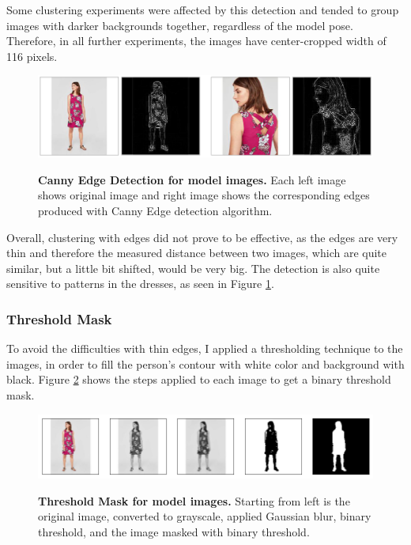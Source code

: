 \documentclass[12pt]{report}
\begin{document}
Some clustering experiments were affected by this detection and tended to group images with darker backgrounds together, regardless of the model pose. Therefore, in all further experiments, the images have center-cropped width of 116 pixels.

\begin{figure}[h]
\centering
{\includegraphics[width=\linewidth]{04_experiments/clustering/edges_data}}
\caption{\label{fig:cluster_edges_data} \textbf{Canny Edge Detection for model images.} Each left image shows original image and right image shows the corresponding edges produced with Canny Edge detection algorithm.}
\end{figure}

Overall, clustering with edges did not prove to be effective, as the edges are very thin and therefore the measured distance between two images, which are quite similar, but a little bit shifted, would be very big. The detection is also quite sensitive to patterns in the dresses, as seen in Figure \ref{fig:cluster_edges_data}.

\subsubsection{Threshold Mask}
To avoid the difficulties with thin edges, I applied a thresholding technique to the images, in order to fill the person's contour with white color and background with black. Figure \ref{fig:cluster_outline_data} shows the steps applied to each image to get a binary threshold mask.

\begin{figure}[h]
\centering
{\includegraphics[width=\linewidth]{04_experiments/clustering/outlines_data}}
\caption{\label{fig:cluster_outline_data} \textbf{Threshold Mask for model images.} Starting from left is the original image, converted to grayscale, applied Gaussian blur, binary threshold, and the image masked with binary threshold.}
\end{figure}
\end{document}
